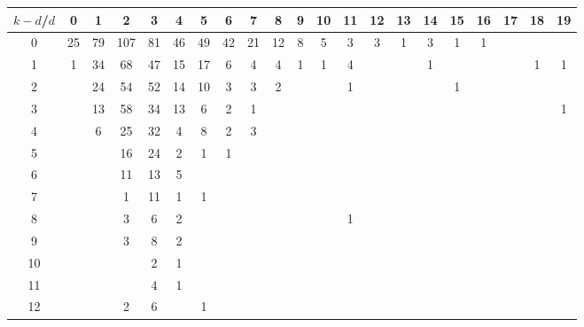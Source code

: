 \documentclass{article}[12pt]
\begin{document}
\begin{landscape}

\begin{table}[h]\footnotesize
{\centering
\begin{tabular}{|c|c|
c|c|c|c|c|c|c|c|c|c|c|c|c|c|c|c|c|c|c|}
  \hline
  $k-d$/$d$ 
 & 0 & 1 & 2 & 3 & 4 & 5 & 6 & 7 & 8 & 9 & 10 & 11 & 12 & 13 & 14 & 15 & 16 & 17 & 18 & 19\\

  \hline
  \hline

0  & 25 & 79 & 107 & 81 & 46 & 49 & 42 & 21 & 12 & 8 & 5 & 3 & 3 & 1 & 3 & 1 & 1 &  &  & \\

1  & 1 & 34 & 68 & 47 & 15 & 17 & 6 & 4 & 4 & 1 & 1 & 4 &  &  & 1 &  &  &  & 1 & 1\\

2  &  & 24 & 54 & 52 & 14 & 10 & 3 & 3 & 2 &  &  & 1 &  &  &  & 1 &  &  &  & \\

3  &  & 13 & 58 & 34 & 13 & 6 & 2 & 1 &  &  &  &  &  &  &  &  &  &  &  & 1\\

4  &  & 6 & 25 & 32 & 4 & 8 & 2 & 3 &  &  &  &  &  &  &  &  &  &  &  & \\

5  &  &  & 16 & 24 & 2 & 1 & 1 &  &  &  &  &  &  &  &  &  &  &  &  & \\

6  &  &  & 11 & 13 & 5 &  &  &  &  &  &  &  &  &  &  &  &  &  &  & \\

7  &  &  & 1 & 11 & 1 & 1 &  &  &  &  &  &  &  &  &  &  &  &  &  & \\

8  &  &  & 3 & 6 & 2 &  &  &  &  &  &  & 1 &  &  &  &  &  &  &  & \\

9  &  &  & 3 & 8 & 2 &  &  &  &  &  &  &  &  &  &  &  &  &  &  & \\

10  &  &  &  & 2 & 1 &  &  &  &  &  &  &  &  &  &  &  &  &  &  & \\

11  &  &  &  & 4 & 1 &  &  &  &  &  &  &  &  &  &  &  &  &  &  & \\

12  &  &  & 2 & 6 &  & 1 &  &  &  &  &  &  &  &  &  &  &  &  &  & \\


\end{tabular}}
\end{table}
\end{landscape}
\end{document}
